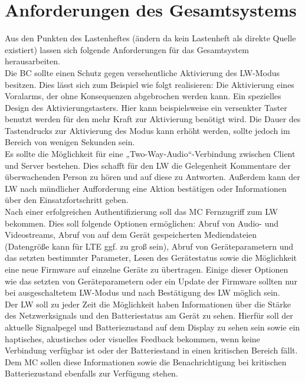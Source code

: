 \documentclass[thesis.tex]{subfiles}
\begin{document}
\section{Anforderungen des Gesamtsystems}
Aus den Punkten des Lastenheftes (ändern da kein Lastenheft als direkte Quelle existiert) lassen sich folgende Anforderungen für das Gesamtsystem herausarbeiten.
\\

Die BC sollte einen Schutz gegen versehentliche Aktivierung des LW-Modus besitzen.
Dies lässt sich zum Beispiel wie folgt realisieren: Die Aktivierung eines Voralarms, der ohne Konsequenzen abgebrochen werden kann.
Ein spezielles Design des Aktivierungstasters. Hier kann beispielsweise ein versenkter Taster benutzt werden für den mehr Kraft zur
Aktivierung benötigt wird.
Die Dauer des Tastendrucks zur Aktivierung des Modus kann erhöht werden, sollte jedoch im Bereich von wenigen Sekunden sein.
\\

Es sollte die Möglichkeit für eine „Two-Way-Audio“-Verbindung zwischen Client und Server bestehen.
Dies schafft für den LW die Gelegenheit Kommentare der überwachenden Person zu hören und auf diese zu Antworten.
Außerdem kann der LW nach mündlicher Aufforderung eine Aktion bestätigen oder Informationen über den Einsatzfortschritt geben.
\\

Nach einer erfolgreichen Authentifizierung soll das MC Fernzugriff zum LW bekommen.
Dies soll folgende Optionen ermöglichen: Abruf von Audio- und Videostreams, Abruf von auf dem Gerät gespeicherten Mediendateien
(Datengröße kann für LTE ggf. zu groß sein), Abruf von Geräteparametern und das setzten bestimmter Parameter, Lesen des Gerätestatus
sowie die Möglichkeit eine neue Firmware auf einzelne Geräte zu übertragen.
Einige dieser Optionen wie das setzten von Geräteparametern oder ein Update der Firmware sollten nur bei ausgeschaltetem LW-Modus
und nach Bestätigung des LW möglich sein.
\\

Der LW soll zu jeder Zeit die Möglichkeit haben Informationen über die Stärke des Netzwerksignals und den Batteriestatus am Gerät zu sehen.
Hierfür soll der aktuelle Signalpegel und Batteriezustand auf dem Display zu sehen sein sowie ein haptisches, akustisches oder visuelles
Feedback bekommen, wenn keine Verbindung verfügbar ist oder der Batteriestand in einen kritischen Bereich fällt.
Dem MC sollen diese Informationen sowie die Benachrichtigung bei kritischen Batteriezustand ebenfalls zur Verfügung stehen.
\\
\end{document}
